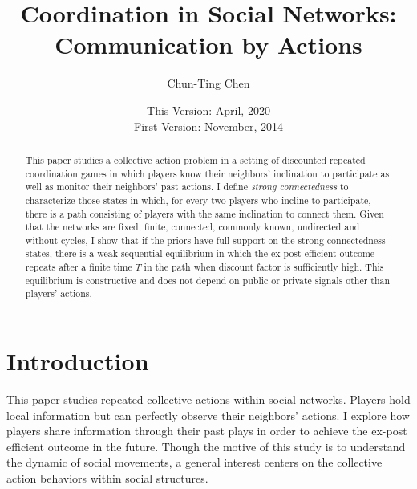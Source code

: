 \documentclass[12pt,letter]{article}
\theoremstyle{definition}
\theoremstyle{remark}
\theoremstyle{claim}
\begin{document}

\title {Coordination in Social Networks: Communication by Actions}
\author {Chun-Ting Chen}
\date{This Version: April, 2020\\
First Version: November, 2014\\ 
}
\maketitle

\begin{abstract}

This paper studies a collective action problem in a setting of discounted repeated coordination games in which players know their neighbors'  inclination to participate as well as monitor their neighbors' past actions. I define \textit{strong connectedness} to characterize those states in which, for every two players who incline to participate, there is a path consisting of players with the same inclination to connect them.  Given that the networks are fixed, finite, connected, commonly known, undirected and without cycles, I show that if the priors have full support on the strong connectedness states, there is a weak sequential equilibrium in which the ex-post efficient outcome repeats after a finite time $T$ in the path when discount factor is sufficiently high. This equilibrium is constructive and does not depend on public or private signals other than players' actions.




\end{abstract}


\section{Introduction} 

This paper studies repeated collective actions within social networks. Players hold local information but can perfectly observe their neighbors' actions. I explore how players share information through their past plays in order to achieve the ex-post efficient outcome in the future. Though the motive of this study is to understand the dynamic of social movements, a general interest centers on the collective action behaviors within social structures.
\end{document}
